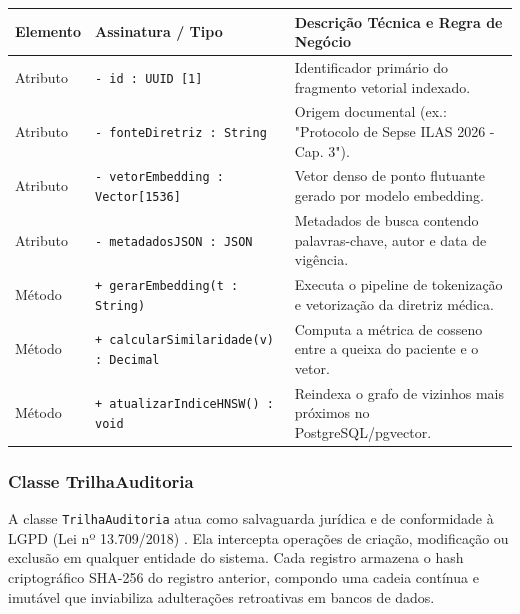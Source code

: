 \begingroup
\small
\noindent\begin{tabularx}{\linewidth}{l >{\raggedright\arraybackslash}p{5.7cm} >{\raggedright\arraybackslash}X}
\toprule
\textbf{Elemento} & \textbf{Assinatura / Tipo} & \textbf{Descrição Técnica e Regra de Negócio} \\
\midrule
Atributo & \texttt{- id : UUID [1]} & Identificador primário do fragmento vetorial indexado. \\
Atributo & \texttt{- fonteDiretriz : String} & Origem documental (ex.: "Protocolo de Sepse ILAS 2026 - Cap. 3"). \\
Atributo & \texttt{- vetorEmbedding : Vector[1536]} & Vetor denso de ponto flutuante gerado por modelo embedding. \\
Atributo & \texttt{- metadadosJSON : JSON} & Metadados de busca contendo palavras-chave, autor e data de vigência. \\
\midrule
Método & \texttt{+ gerarEmbedding(t : String)} & Executa o pipeline de tokenização e vetorização da diretriz médica. \\
Método & \texttt{+ calcularSimilaridade(v) : Decimal} & Computa a métrica de cosseno entre a queixa do paciente e o vetor. \\
Método & \texttt{+ atualizarIndiceHNSW() : void} & Reindexa o grafo de vizinhos mais próximos no PostgreSQL/pgvector. \\
\bottomrule
\end{tabularx}
\endgroup

\subsubsection{Classe TrilhaAuditoria}
A classe \texttt{TrilhaAuditoria} atua como salvaguarda jurídica e de conformidade à LGPD (Lei nº 13.709/2018) \cite{brasil_lgpd:2018}. Ela intercepta operações de criação, modificação ou exclusão em qualquer entidade do sistema. Cada registro armazena o hash criptográfico SHA-256 do registro anterior, compondo uma cadeia contínua e imutável que inviabiliza adulterações retroativas em bancos de dados.

